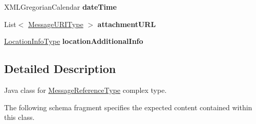 \begin{DoxyCompactItemize}
\item 
\hypertarget{classcom_1_1telefonica_1_1schemas_1_1unica_1_1rest_1_1mms_1_1v1_1_1MessageReferenceType_a687e36ef0d78fb9378c14ed47ce64eba}{
XMLGregorianCalendar {\bfseries dateTime}}
\label{classcom_1_1telefonica_1_1schemas_1_1unica_1_1rest_1_1mms_1_1v1_1_1MessageReferenceType_a687e36ef0d78fb9378c14ed47ce64eba}

\item 
\hypertarget{classcom_1_1telefonica_1_1schemas_1_1unica_1_1rest_1_1mms_1_1v1_1_1MessageReferenceType_a97334e3f2ff0b33f7708433906167e9e}{
List$<$ \hyperlink{classcom_1_1telefonica_1_1schemas_1_1unica_1_1rest_1_1mms_1_1v1_1_1MessageURIType}{MessageURIType} $>$ {\bfseries attachmentURL}}
\label{classcom_1_1telefonica_1_1schemas_1_1unica_1_1rest_1_1mms_1_1v1_1_1MessageReferenceType_a97334e3f2ff0b33f7708433906167e9e}

\item 
\hypertarget{classcom_1_1telefonica_1_1schemas_1_1unica_1_1rest_1_1mms_1_1v1_1_1MessageReferenceType_a3983e5029c23480788fff05489ef895c}{
\hyperlink{classcom_1_1telefonica_1_1schemas_1_1unica_1_1rest_1_1mms_1_1v1_1_1LocationInfoType}{LocationInfoType} {\bfseries locationAdditionalInfo}}
\label{classcom_1_1telefonica_1_1schemas_1_1unica_1_1rest_1_1mms_1_1v1_1_1MessageReferenceType_a3983e5029c23480788fff05489ef895c}

\end{DoxyCompactItemize}


\subsection{Detailed Description}
Java class for \hyperlink{classcom_1_1telefonica_1_1schemas_1_1unica_1_1rest_1_1mms_1_1v1_1_1MessageReferenceType}{MessageReferenceType} complex type.

The following schema fragment specifies the expected content contained within this class.


